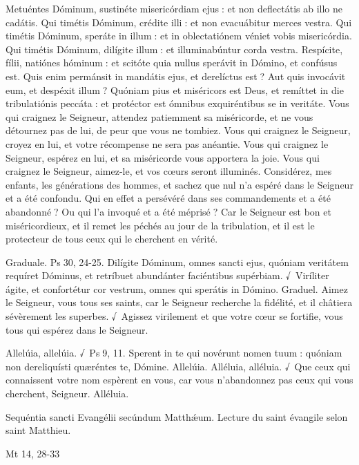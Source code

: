 \begin{paracol}{2}
\switchcolumn*

Metuéntes Dóminum, sustinéte  misericórdiam ejus : et non deflectátis ab illo ne cadátis. Qui timétis Dóminum, crédite illi : et non evacuábitur merces vestra. Qui timétis Dóminum, speráte in illum : et in oblectatiónem véniet vobis misericórdia. Qui timétis Dóminum, dilígite illum : et illuminabúntur corda vestra. Respícite, fílii, natiónes hóminum : et scitóte quia nullus sperávit in Dómino, et confúsus est. Quis enim permánsit in mandátis ejus, et derelíctus est ? Aut quis invocávit eum, et despéxit illum ? Quóniam pius et miséricors est Deus, et remíttet in die tribulatiónis peccáta : et protéctor est ómnibus exquiréntibus se in veritáte.
\switchcolumn
Vous qui craignez le Seigneur,  attendez patiemment sa miséricorde, et ne vous détournez pas de lui, de peur que vous ne tombiez. Vous qui craignez le Seigneur, croyez en lui, et votre récompense ne sera pas anéantie. Vous qui craignez le Seigneur, espérez en lui, et sa miséricorde vous apportera la joie. Vous qui craignez le Seigneur, aimez-le, et vos cœurs seront illuminés. Considérez, mes enfants, les générations des hommes, et sachez que nul n’a espéré dans le Seigneur et a été confondu. Qui en effet a persévéré dans ses commandements et a été abandonné ? Ou qui l’a invoqué et a été méprisé ? Car le Seigneur est bon et miséricordieux, et il remet les péchés au jour de la tribulation, et il est le protecteur de tous ceux qui le cherchent en vérité.
\switchcolumn*

Graduale. Ps 30, 24-25. Dilígite Dóminum, omnes sancti ejus, quóniam veritátem requíret Dóminus, et retríbuet abundánter faciéntibus supérbiam. √~Viríliter ágite, et confortétur cor vestrum, omnes qui sperátis in Dómino.
\switchcolumn
Graduel. Aimez le Seigneur, vous tous ses saints, car le Seigneur recherche la fidélité, et il châtiera sévèrement les superbes. √~Agissez virilement et que votre cœur se fortifie, vous tous qui espérez dans le Seigneur.
\switchcolumn*

Allelúia, allelúia. √~Ps 9, 11. Sperent in te qui novérunt nomen tuum : quóniam non dereliquísti quæréntes te, Dómine. Allelúia.
\switchcolumn
Alléluia, alléluia. √~Que ceux qui connaissent votre nom espèrent en vous, car vous n’abandonnez pas ceux qui vous cherchent, Seigneur. Alléluia.
\switchcolumn*

Sequéntia sancti Evangélii secúndum Matthǽum.
\switchcolumn
Lecture du saint évangile selon saint Matthieu.
\switchcolumn*

Mt 14, 28-33
\switchcolumn


\end{paracol}
